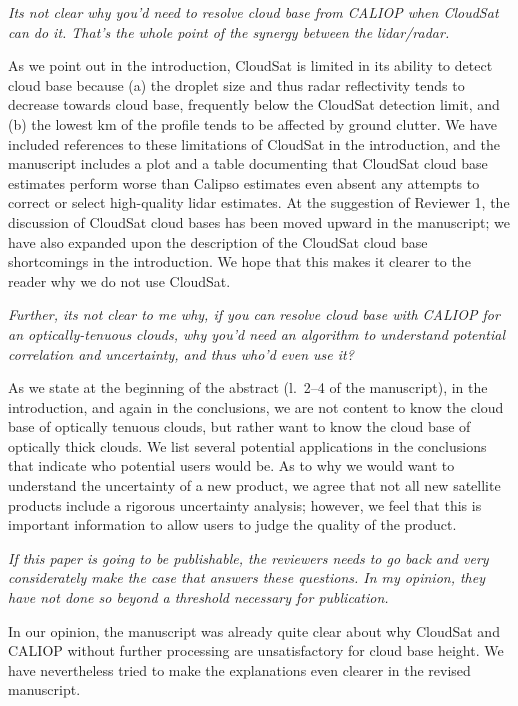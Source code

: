 \documentclass[12pt,a4paper]{responses}
\begin{document}
\textit{Its not clear why you’d need to resolve cloud base from CALIOP when CloudSat can
do it. That’s the whole point of the synergy between the lidar/radar.} 


As we point out in the introduction, CloudSat is limited in its ability to
detect cloud base because (a) the droplet size and thus radar reflectivity tends
to decrease towards cloud base, frequently below the CloudSat detection limit,
and (b) the lowest km of the profile tends to be affected by ground clutter.  We
have included references to these limitations of CloudSat in the introduction,
and the manuscript includes a plot and a table documenting that CloudSat cloud
base estimates perform worse than Calipso estimates even absent any attempts to
correct or select high-quality lidar estimates.  At the suggestion of Reviewer
1, the discussion of CloudSat cloud bases has been moved upward in the
manuscript; we have also expanded upon the description of the CloudSat cloud
base shortcomings in the introduction.  We hope that this makes it clearer to
the reader why we do not use CloudSat.

\textit{Further, its not clear to me why, if you can resolve cloud base with
  CALIOP for an optically-tenuous clouds, why you’d need an algorithm to
  understand potential correlation and uncertainty, and thus who’d even use it?}

As we state at the beginning of the abstract (l.~2--4 of the manuscript), in the
introduction, and again in the conclusions, we are not content to know the cloud
base of optically tenuous clouds, but rather want to know the cloud base of
optically thick clouds.  We list several potential applications in the
conclusions that indicate who potential users would be.  As to why we would want
to understand the uncertainty of a new product, we agree that not all new
satellite products include a rigorous uncertainty analysis; however, we feel
that this is important information to allow users to judge the quality of the
product.

\textit{If this paper is going to be publishable, the reviewers needs
to go back and very considerately make the case that answers these questions. In my
opinion, they have not done so beyond a threshold necessary for publication.}

In our opinion, the manuscript was already quite clear about why CloudSat and
CALIOP without further processing are unsatisfactory for cloud base height.  We
have nevertheless tried to make the explanations even clearer in the revised manuscript.
\end{document}
